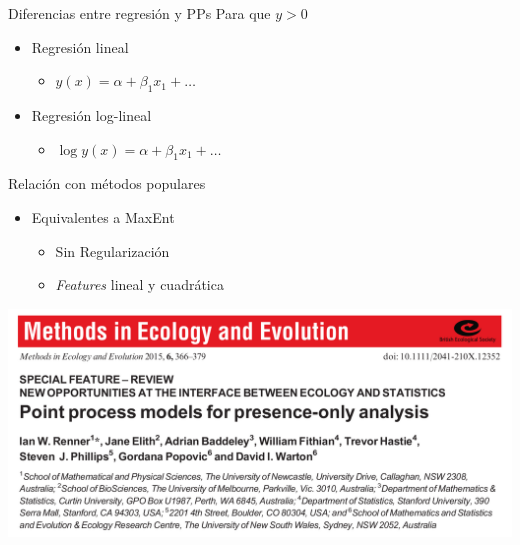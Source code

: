 \documentclass[
  11pt,
  ignorenonframetext,
]{beamer}
\providecommand{\tightlist}{%
  \setlength{\itemsep}{0pt}\setlength{\parskip}{0pt}}
\begin{document}
\begin{frame}{Diferencias entre regresión y PPs}
\protect\hypertarget{diferencias-entre-regresiuxf3n-y-pps-1}{}
Para que \(y >0\)

\begin{itemize}
\item
  Regresión lineal

  \begin{itemize}
  \tightlist
  \item
    \(y(x) = \alpha + \beta_1 x_1 + \dots\)
  \end{itemize}
\item
  Regresión log-lineal

  \begin{itemize}
  \tightlist
  \item
    \(\log y(x) = \alpha + \beta_1 x_1 + \dots\)
  \end{itemize}
\end{itemize}
\end{frame}

\begin{frame}{Relación con métodos populares}
\protect\hypertarget{relaciuxf3n-con-muxe9todos-populares}{}
\begin{itemize}
\item
  Equivalentes a MaxEnt

  \begin{itemize}
  \tightlist
  \item
    Sin Regularización
  \item
    \emph{Features} lineal y cuadrática
  \end{itemize}
\end{itemize}

\includegraphics{Figuras/Renner.png}
\end{frame}
\end{document}
